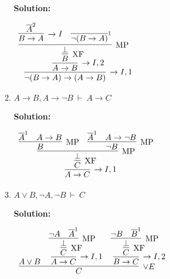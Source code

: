\documentclass[11pt]{report}
\newcommand{\temp}[2]{{\overline{#2}}^{#1}}
\begin{document}
\begin{enumerate}
\begin{enumerate}
		\textbf{Solution:}

		\begin{center}
			$\begin{array}{c}
				\infer[\to I, 1]{\lnot(B \to A) \to (A \to B)}
					{\infer[\to I, 2]{A \to B}
						{\infer[\XF]{B}
							{\infer[\MP]{\bot}
								{\infer[\to I]{B \to A}{\temp{2}{A}}
								&
								\temp{1}{\lnot(B \to A)}}}}}
			\end{array}$
		\end{center}

		\item $ A \to B, A \to \lnot B \ \vdash \ A \to C$
		
		\textbf{Solution:}

		\begin{center}
			$\begin{array}{c}
				\infer[\to I, 1]{A \to C}
					{\infer[\XF]{C}
						{\infer[\MP]{\bot}
							{\infer[\MP]{B}{\temp{1}{A}& A \to B}
							&
							\infer[\MP]{\lnot B}{\temp{1}{A} & A \to \lnot B}}}}
			\end{array}$
		\end{center}
		
		\newpage
		\item $A \lor B, \lnot A, \lnot B \ \vdash \ C$
		
		\textbf{Solution:}

		\begin{center}
			$\begin{array}{c}
				\infer[\lor E]{C}
					{A \lor B
					&
					\infer[\to I, 1]{A \to C}
						{\infer[\XF]{C}
							{\infer[\MP]{\bot}
								{\lnot A & \temp{1}{A}}}}
					&
					\infer[\to I, 2]{B \to C}
						{\infer[\XF]{C}
							{\infer[\MP]{\bot}
								{\lnot B & \temp{1}{B}}}}}
			\end{array}$
		\end{center}
		\newpage
	\end{enumerate}

\end{enumerate}	
\end{document}

